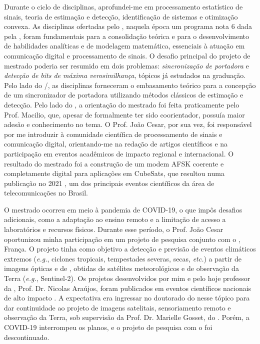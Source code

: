 \documentclass{article}
\begin{document}
Durante o ciclo de disciplinas, aprofundei-me em processamento estatístico de sinais, teoria de estimação e detecção, identificação de sistemas e otimização convexa. As disciplinas ofertadas pelo , naquela época um programa nota 6 dada pela , foram fundamentais para a consolidação teórica e para o desenvolvimento de habilidades analíticas e de modelagem matemática, essenciais à atuação em comunicação digital e processamento de sinais. O desafio principal do projeto de mestrado poderia ser resumido em dois problemas: \emph{sincronização de portadora} e \textit{detecção de bits de máxima verosimilhança}, tópicos já estudados na graduação. Pelo lado do /, as disciplinas forneceram o embasamento teórico para a concepção de um sincronizador de portadora utilizando métodos clássicos de estimação e detecção. Pelo lado do , a orientação do mestrado foi feita praticamente pelo Prof. Macilio, que, apesar de formalmente ter sido coorientador, possuía maior adesão e conhecimento no tema. O Prof. João Cesar, por sua vez, foi responsável por me introduzir à comunidade científica de processamento de sinais e comunicação digital, orientando-me na redação de artigos científicos e na participação em eventos acadêmicos de impacto regional e internacional. O resultado do mestrado foi a construção de um modem AFSK coerente e completamente digital para aplicações em CubeSats, que resultou numa publicação no  2021 \cite{pacelliAlldigitalAFSKModem2020}, um dos principais eventos científicos da área de telecomunicações no Brasil.

O mestrado ocorreu em meio à pandemia de COVID-19, o que impôs desafios adicionais, como a adaptação ao ensino remoto e a limitação de acesso a laboratórios e recursos físicos. Durante esse período, o Prof. João Cesar oportunizou minha participação em um projeto de pesquisa conjunto com o , França. O projeto tinha como objetivo a detecção e previsão de eventos climáticos extremos (\textit{e.g.}, ciclones tropicais, tempestades severas, secas, \textit{etc.}) a partir de imagens ópticas e de , obtidas de satélites meteorológicos e de observação da Terra (\textit{e.g.}, Sentinel-2). Os projetos desenvolvidos por mim e pelo hoje professor da , Prof. Dr. Nicolas Araújos, foram publicados em eventos científicos nacionais de alto impacto \cite{pacelliDataBasedEstimationPowerLaw2024,moreiraConvolutionalLongShortTermMemory2022}. A expectativa era ingressar no doutorado do  nesse tópico para dar continuidade ao projeto de imagens satelitais, sensoriamento remoto e observação da Terra, sob supervisão da Prof. Dr. Marielle Gosset, do . Porém, a COVID-19 interrompeu os planos, e o projeto de pesquisa com o  foi descontinuado.
\end{document}
